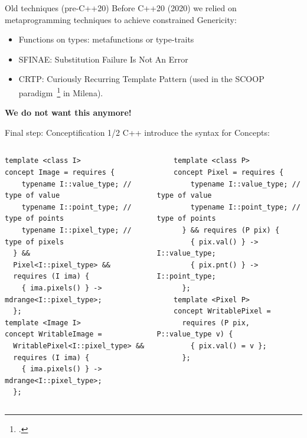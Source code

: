 \documentclass[12pt,aspectratio=169]{beamer}
\begin{document}
\begin{frame}[fragile]{Old techniques (pre-C++20)}
  Before C++20 (2020) we relied on metaprogramming techniques to achieve constrained Genericity:
  \vspace{-0.2cm}\begin{itemize}
    \item Functions on types: metafunctions or type-traits
    \item SFINAE: Substitution Failure Is Not An Error
    \item CRTP: Curiously Recurring Template Pattern (used in the SCOOP paradigm~\footcite{geraud.2008.mpool} in Milena).
  \end{itemize}
  \vspace{-0.3cm}
  \begin{center}\textbf{We do not want this anymore!}\end{center}
\end{frame}

\begin{frame}[fragile]{Final step: Conceptification 1/2}
  C++ introduce the syntax for Concepts:
  \begin{columns}[T,onlytextwidth]
    \begin{verbatim}
template <class I>
concept Image = requires {
    typename I::value_type; // type of value
    typename I::point_type; // type of points
    typename I::pixel_type; // type of pixels
  } &&
  Pixel<I::pixel_type> &&
  requires (I ima) {
    { ima.pixels() } -> mdrange<I::pixel_type>;
  };
template <Image I>
concept WritableImage = 
  WritablePixel<I::pixel_type> &&
  requires (I ima) {
    { ima.pixels() } -> mdrange<I::pixel_type>;
  };
  \end{verbatim}

    \begin{verbatim}
    template <class P>
    concept Pixel = requires {
        typename I::value_type; // type of value
        typename I::point_type; // type of points
      } && requires (P pix) {
        { pix.val() } -> I::value_type;
        { pix.pnt() } -> I::point_type;
      };
    template <Pixel P>
    concept WritablePixel = 
      requires (P pix, P::value_type v) {
        { pix.val() = v };
      };
  \end{verbatim}
  \end{columns}
\end{frame}
\end{document}

